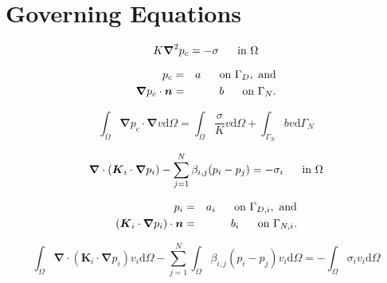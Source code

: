 \documentclass[12pt,twoside,a4paper]{article}
\begin{document}

\section{Governing Equations}

\begin{equation}
 K \boldsymbol{\nabla}^2 p_c  = - \sigma \text{ \hspace{10pt} in } \Omega
\end{equation}

\begin{eqnarray}
p_c &=& a \text{ \hspace{10pt} on } \Gamma_{D},\text{ and}\\
\boldsymbol{\nabla} p_c \cdot \boldsymbol{n} &=& b \text{ \hspace{10pt} on } \Gamma_{N}.
\end{eqnarray}


\begin{equation}
\int_\Omega \boldsymbol{\nabla} p_c \cdot \boldsymbol{\nabla}  v  \mathrm{d}\Omega = 
 \int_\Omega \frac{\sigma}{K} v \mathrm{d}\Omega + 
 \int_{\Gamma_{N}} b v     \mathrm{d}\Gamma_{N} 
\end{equation}

\begin{equation}
\boldsymbol{\nabla} \cdot \left( \boldsymbol{K}_i \cdot \boldsymbol{\nabla} p_i   \right) - \sum_{j=1}^{N}\beta_{i,j}(p_i-p_j) = - \sigma_i \text{ \hspace{10pt} in } \Omega
\end{equation}

\begin{eqnarray}
p_i &=& a_i \text{ \hspace{10pt} on } \Gamma_{D,i},\text{ and}\\
\left( \boldsymbol{K}_i \cdot \boldsymbol{\nabla} p_i \right)\cdot \boldsymbol{n} &=& b_i \text{ \hspace{10pt} on } \Gamma_{N,i}.
\end{eqnarray}

\begin{equation}
\int_\Omega \boldsymbol{\nabla} \cdot \left( \boldsymbol{K}_i \cdot \boldsymbol{\nabla} p_i   \right) v_i \mathrm{d}\Omega
- \sum_{j=1}^N \int_\Omega \beta_{i,j}(p_i-p_j)v_i\mathrm{d}\Omega = 
- \int_\Omega \sigma_iv_i\mathrm{d}\Omega
\end{equation}
\end{document}
